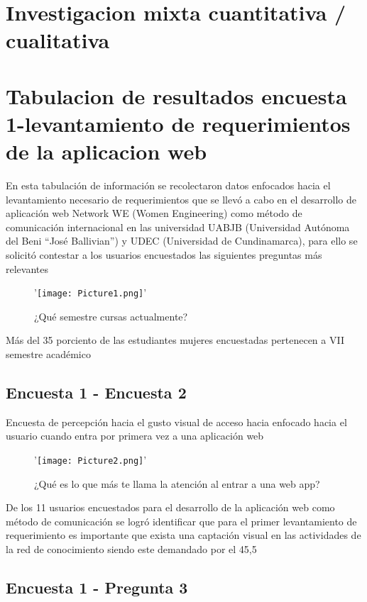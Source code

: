 \documentclass[hidelinks]{Documento}
\begin{document}
\section{Investigacion mixta cuantitativa / cualitativa}
\section{Tabulacion de resultados encuesta 1-levantamiento de requerimientos de la aplicacion web}

En esta tabulación de información se recolectaron datos enfocados hacia el levantamiento necesario de requerimientos que se llevó a cabo en el desarrollo de aplicación web Network WE (Women Engineering) como método de comunicación internacional en las universidad UABJB (Universidad Autónoma del Beni “José Ballivian”) y UDEC (Universidad de Cundinamarca), para ello se solicitó contestar a los usuarios encuestados las siguientes preguntas más relevantes

\begin{figure}[h]
\centering
'\texttt{[image: Picture1.png]}'
\caption{¿Qué semestre cursas actualmente?}
\label{fig:Picture1.png}
\end{figure}

Más del 35 porciento de las estudiantes mujeres encuestadas pertenecen a VII semestre académico 

\subsection{Encuesta 1 - Encuesta 2}

Encuesta de percepción hacia el gusto visual de acceso hacia enfocado hacia el usuario cuando entra por primera vez a una aplicación web


\begin{figure}[h]
\centering
'\texttt{[image: Picture2.png]}'
\caption{¿Qué es lo que más te llama la atención al entrar a una web app?}
\label{fig:Picture2.png}
\end{figure}


De los 11 usuarios encuestados para el desarrollo de la aplicación web como método de comunicación se logró identificar que para el primer levantamiento de requerimiento es importante que exista una captación visual en las actividades de la red de conocimiento siendo este demandado por el 45,5%


\subsection{Encuesta 1 - Pregunta 3}
\end{document}
